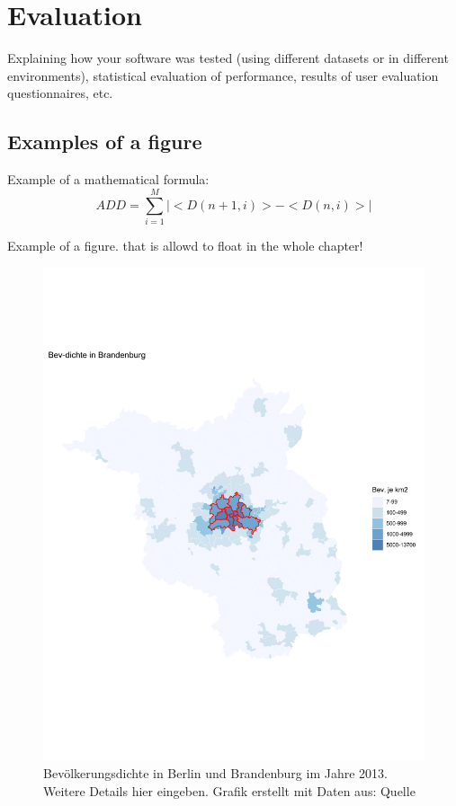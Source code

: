 \chapter{Evaluation}

Explaining how your software was tested (using different datasets or in different environments), statistical evaluation of performance, results of user evaluation questionnaires, etc.

\section{Examples of a figure}

Example of a mathematical formula:
\begin{equation}
  ADD = \sum_{i=1}^{M}|<D(n+1,i)>-<D(n,i)>|
  \label{add}
\end{equation}

Example of a figure. that is allowd to float in the whole chapter!

\begin{figure}[ht!]
\begin{center}
\includegraphics[scale=0.5]{body/figures/Gem-2.pdf}
\end{center}
\caption[Bevölkerungsdichte in Berlin und Brandenburg]{Bevölkerungsdichte in Berlin und Brandenburg im Jahre 2013. Weitere Details hier eingeben. Grafik erstellt mit Daten aus: Quelle}
\label{fig_bb1}
\end{figure}

